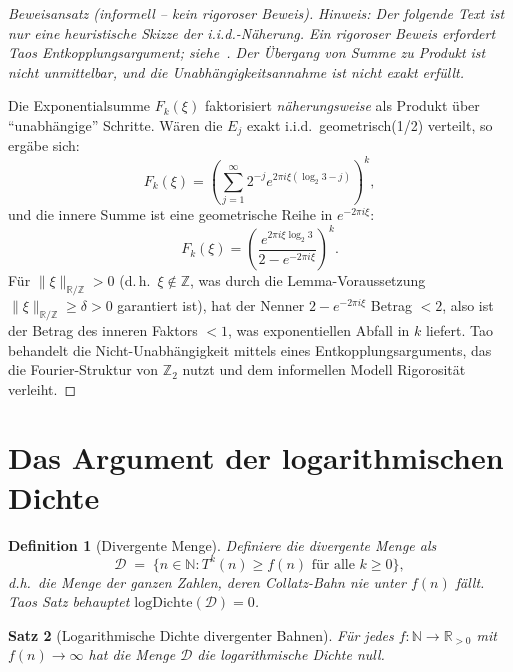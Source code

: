 \documentclass[12pt,a4paper]{article}
\newtheorem{theorem}{Satz}[section]
\newtheorem{definition}[theorem]{Definition}
\begin{document}
\begin{proof}[Beweisansatz (informell -- kein rigoroser Beweis)]
\emph{Hinweis: Der folgende Text ist nur eine heuristische Skizze der i.i.d.-Näherung.
Ein rigoroser Beweis erfordert Taos Entkopplungsargument; siehe~\cite{Tao2022}.
Der Übergang von Summe zu Produkt ist nicht unmittelbar, und die
Unabhängigkeitsannahme ist nicht exakt erfüllt.}

Die Exponentialsumme $F_k(\xi)$ faktorisiert \emph{näherungsweise} als Produkt über
``unabhängige'' Schritte. Wären die $E_j$ exakt i.i.d.\ geometrisch(1/2) verteilt, so ergäbe sich:
\[
  F_k(\xi) = \left(\sum_{j=1}^\infty 2^{-j} e^{2\pi i \xi (\log_2 3 - j)}\right)^k,
\]
und die innere Summe ist eine geometrische Reihe in $e^{-2\pi i \xi}$:
\[
  F_k(\xi) = \left(\frac{e^{2\pi i \xi \log_2 3}}{2 - e^{-2\pi i \xi}}\right)^k.
\]
Für $\|\xi\|_{\mathbb{R}/\mathbb{Z}} > 0$ (d.\,h.\ $\xi \notin \mathbb{Z}$, was durch
die Lemma-Voraussetzung $\|\xi\|_{\mathbb{R}/\mathbb{Z}} \geq \delta > 0$ garantiert ist),
hat der Nenner $2 - e^{-2\pi i \xi}$ Betrag $< 2$, also ist der Betrag des inneren
Faktors $< 1$, was exponentiellen Abfall in $k$ liefert.
Tao behandelt die Nicht-Unabhängigkeit mittels eines Entkopplungsarguments, das die
Fourier-Struktur von $\mathbb{Z}_2$ nutzt und dem informellen Modell Rigorosität verleiht.
\end{proof}

\section{Das Argument der logarithmischen Dichte}

\begin{definition}[Divergente Menge]\label{def:divergent}
Definiere die \emph{divergente Menge} als
\[
  \mathcal{D} \;=\; \bigl\{ n \in \mathbb{N} : T^k(n) \geq f(n) \text{ für alle } k \geq 0 \bigr\},
\]
d.h.\ die Menge der ganzen Zahlen, deren Collatz-Bahn nie unter $f(n)$ fällt.
Taos Satz behauptet $\mathrm{logDichte}(\mathcal{D}) = 0$.
\end{definition}

\begin{theorem}[Logarithmische Dichte divergenter Bahnen]\label{thm:logdichte_null}
Für jedes $f\colon \mathbb{N} \to \mathbb{R}_{>0}$ mit $f(n) \to \infty$ hat die
Menge $\mathcal{D}$ die logarithmische Dichte null.
\end{theorem}
\end{document}

